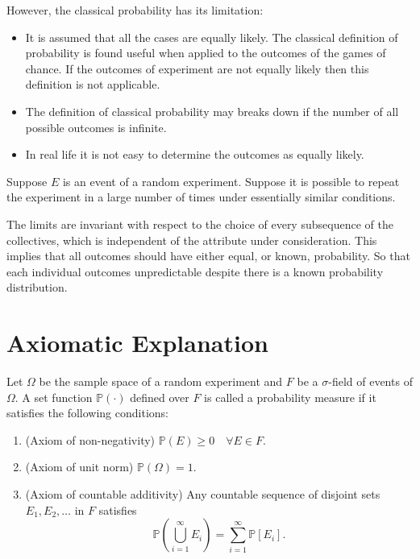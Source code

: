 However, the classical probability has its limitation:
\begin{itemize}
    \item It is assumed that all the cases are equally likely. The classical definition
    of probability is found useful when applied to the outcomes of the games of chance. If the 
    outcomes of experiment are not equally likely then this definition is not applicable.
    \item The definition of classical probability may breaks down if the number of 
    all possible outcomes is infinite.
    \item In real life it is not easy to determine the outcomes as equally likely.
\end{itemize}

Suppose $E$ is an event of a random experiment. Suppose it is possible to repeat the 
experiment in a large number of times under essentially similar conditions.

\begin{definition}
    The limits are invariant with respect to the choice of every subsequence of the 
    collectives, which is independent of the attribute under consideration. This 
    implies that all outcomes should have either equal, or known, probability. So that 
    each individual outcomes unpredictable despite there is a known probability distribution.
\end{definition}

\section{Axiomatic Explanation}

\begin{axiom}
Let $\Omega$ be the sample space of a random experiment and $F$ be a $\sigma$-field 
of events of $\Omega$. A set function $\mathbb{P}(\cdot)$ defined over $F$ is called 
a probability measure if it satisfies the following conditions:
\begin{enumerate}
    \item[$K1$] (Axiom of non-negativity) $\mathbb{P}(E) \geq 0 \quad \forall E \in F$. 
    \item[$K2$] (Axiom of unit norm) $\mathbb{P}(\Omega) = 1$.
    \item[$K3$] (Axiom of countable additivity) Any countable 
    sequence of disjoint sets $E_1, E_2, \ldots$ in $F$ satisfies 
    \begin{equation}
        \mathbb{P} \left( \bigcup^{\infty}_{i=1} E_i \right) = \sum^\infty_{i=1} \mathbb{P}[E_i].
    \end{equation}
\end{enumerate}
\end{axiom}

